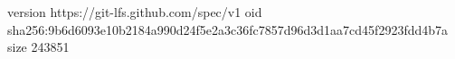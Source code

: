 version https://git-lfs.github.com/spec/v1
oid sha256:9b6d6093e10b2184a990d24f5e2a3c36fc7857d96d3d1aa7cd45f2923fdd4b7a
size 243851
